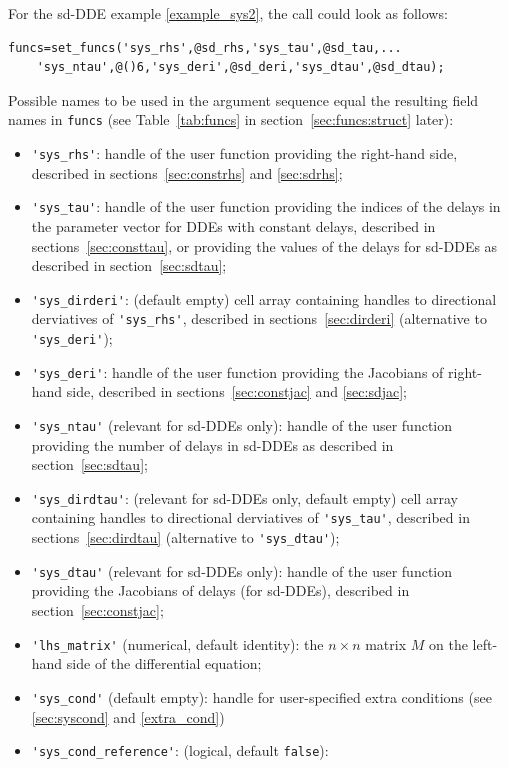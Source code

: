 \documentclass[10pt]{scrartcl}
\newcommand{\blist}[1]{\mbox{\lstinline!#1!}}
\begin{document}
For the sd-DDE example \eqref{example_sys2}, the call could look as follows:
\begin{lstlisting}
funcs=set_funcs('sys_rhs',@sd_rhs,'sys_tau',@sd_tau,...
    'sys_ntau',@()6,'sys_deri',@sd_deri,'sys_dtau',@sd_dtau);  
\end{lstlisting}
Possible names to be used in the argument sequence
equal the resulting field names in \blist{funcs} (see
Table~\ref{tab:funcs} in section~\ref{sec:funcs:struct} later):
\begin{itemize}
\item \blist{'sys_rhs'}: handle of the user function providing the
  right-hand side, described in sections~\ref{sec:constrhs} and
  \ref{sec:sdrhs};
\item \blist{'sys_tau'}: handle of the user function providing the
  indices of the delays in the parameter vector for DDEs with constant
  delays, described in sections~\ref{sec:consttau}, or providing the
  values of the delays for sd-DDEs as described in
  section~\ref{sec:sdtau};
\item \blist{'sys_dirderi'}: (default empty) cell array containing
  handles to directional derviatives of \blist{'sys_rhs'}, described
  in sections~\ref{sec:dirderi} (alternative to \blist{'sys_deri'});
\item \blist{'sys_deri'}: handle of the user function providing the
  Jacobians of right-hand side, described in
  sections~\ref{sec:constjac} and \ref{sec:sdjac};
\item \blist{'sys_ntau'} (relevant for sd-DDEs only): handle of the
  user function providing the number of delays in sd-DDEs as described
  in section~\ref{sec:sdtau};
\item \blist{'sys_dirdtau'}: (relevant for sd-DDEs only, default empty)
  cell array containing handles to directional derviatives of
  \blist{'sys_tau'}, described in sections~\ref{sec:dirdtau}
  (alternative to \blist{'sys_dtau'});
\item \blist{'sys_dtau'} (relevant for sd-DDEs only): handle of the user
  function providing the Jacobians of delays (for sd-DDEs), described
  in section~\ref{sec:constjac};
\item \blist{'lhs_matrix'} (numerical, default identity): the
  $n\times n$ matrix $M$ on the left-hand side of the differential equation;
\item \blist{'sys_cond'} (default empty): handle for user-specified extra conditions
  (see \cref{sec:syscond} and \cref{extra_cond})
\item \blist{'sys_cond_reference'}: (logical, default \blist{false}):

\end{itemize}
\end{document}
